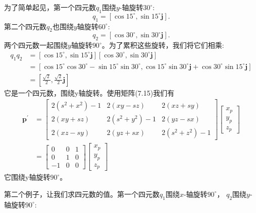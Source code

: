 为了简单起见，第一个四元数$q_{1}$围绕$y$-轴旋转$30^{\circ}$:
$$
q_{1}=\left[\cos 15^{\circ}, \sin 15^{\circ} \mathbf{j}\right] .
$$
第二个四元数$q_{2}$也围绕$y$轴旋转$60^{\circ}$:
$$
q_{2}=\left[\cos 30^{\circ}, \sin 30^{\circ} \mathbf{j}\right] .
$$
两个四元数一起围绕$y$轴旋转$90^{\circ}$。为了累积这些旋转，我们将它们相乘:
$$
\begin{aligned}
q_{1} q_{2} & =\left[\cos 15^{\circ}, \sin 15^{\circ} \mathbf{j}\right]\left[\cos 30^{\circ}, \sin 30^{\circ} \mathbf{j}\right] \\
& =\left[\cos 15^{\circ} \cos 30^{\circ}-\sin 15^{\circ} \sin 30^{\circ}, \cos 15^{\circ} \sin 30^{\circ} \mathbf{j}+\cos 30^{\circ} \sin 15^{\circ} \mathbf{j}\right] \\
& =\left[\frac{\sqrt{2}}{2}, \frac{\sqrt{2}}{2} \mathbf{j}\right]
\end{aligned}
$$
它是一个四元数，围绕y轴旋转。使用矩阵(7.15)我们有
$$
\begin{aligned}
\mathbf{p}^{\prime} & =\left[\begin{array}{ccc}
2\left(s^{2}+x^{2}\right)-1 & 2(x y-s z) & 2(x z+s y) \\
2(x y+s z) & 2\left(s^{2}+y^{2}\right)-1 & 2(y z-s x) \\
2(x z-s y) & 2(y z+s x) & 2\left(s^{2}+z^{2}\right)-1
\end{array}\right]\left[\begin{array}{l}
x_{p} \\
y_{p} \\
z_{p}
\end{array}\right] \\
& =\left[\begin{array}{ccc}
0 & 0 & 1 \\
0 & 1 & 0 \\
-1 & 0 & 0
\end{array}\right]\left[\begin{array}{c}
x_{p} \\
y_{p} \\
z_{p}
\end{array}\right]
\end{aligned}
$$
它围绕y轴旋转$90^{\circ}$。

第二个例子，让我们求四元数的值。第一个四元数$q_{1}$围绕$x$-轴旋转$90^{\circ}$， $q_{2}$围绕$y$-轴旋转$90^{\circ}$:

